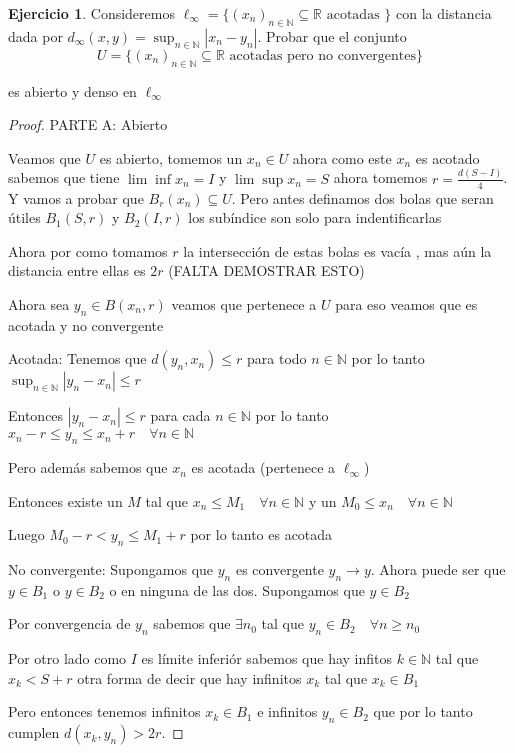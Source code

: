 \documentclass[12pt]{article}
\newcommand{\R}{\mathbb{R}}
\newcommand{\N}{\mathbb{N}}
\newcommand{\ra}{\rightarrow}
\theoremstyle{definition}
\newtheorem{ej}{Ejercicio}
\begin{document}
\begin{ej}
  Consideremos $\ell_{\infty} = \{(x_n)_{n \in\N } \subseteq \R \text{ acotadas }\}$ con la distancia dada por $d_{\infty}(x,y)= \sup_{n\in\N}|x_n - y_n|$. Probar que el conjunto
  $$ U = \{(x_n)_{n\in\N} \subseteq \R \text{ acotadas pero no convergentes}\}$$

  es abierto y denso en $\ell_{\infty}$
  \begin{proof}
PARTE A: Abierto

    Veamos que $U$ es abierto, tomemos un $x_n \in U$ ahora como este $x_n$ es acotado sabemos que tiene $\lim \inf x_n = I$ y $\lim \sup x_n = S$ ahora tomemos $r = \frac{d(S - I)}{4}$. Y vamos a probar que $B_r(x_n) \subseteq U$. Pero antes definamos dos bolas que seran útiles $B_1(S,r)$ y $B_2(I,r)$ los subíndice son solo para indentificarlas

    Ahora por como tomamos $r$ la intersección de estas bolas es vacía , mas aún la distancia entre ellas es $2r$ (FALTA DEMOSTRAR ESTO)

    Ahora sea $y_n \in B(x_n,r)$ veamos que pertenece a $U$ para eso veamos que es acotada y no convergente

    Acotada: Tenemos que $d(y_n,x_n) \leq r$ para todo $n \in \N$ por lo tanto $\sup_{n \in \N} |y_n - x_n| \leq r$

    Entonces $| y_n -x_n | \leq r $ para cada $n \in \N$ por lo tanto $x_n -r \leq y_n \leq x_n +r \quad \forall n \in \N$ 

    Pero además sabemos que $x_n$ es acotada (pertenece a $\ell_{\infty}$) 

    Entonces existe un $M$ tal que $x_n \leq M_1 \quad \forall n \in \N$ y un $M_0 \leq x_n \quad \forall n \in \N$ 

    Luego $M_0 - r <y_n \leq M_1 + r $ por lo tanto es acotada

    No convergente: Supongamos que $y_n$ es convergente $y_n \ra y$. Ahora puede ser que $y \in B_1$ o $y \in B_2$ o en ninguna de las dos. Supongamos que $y \in B_2$


	  Por convergencia de $y_n$ sabemos que $\exists n_0 $ tal que $ y_n \in B_2 \quad \forall n \geq n_0$  

    Por otro lado como $I$ es límite inferiór sabemos que hay infitos $k \in \N$ tal que $ x_k< S + r $ otra forma de decir que hay infinitos $x_k$ tal que $x_k \in B_1$ 

    Pero entonces tenemos infinitos $x_k \in B_1$ e infinitos $y_n \in B_2$ que  por lo tanto cumplen $d(x_k,y_n) > 2r$.


\end{proof}
\end{ej}
\end{document}
